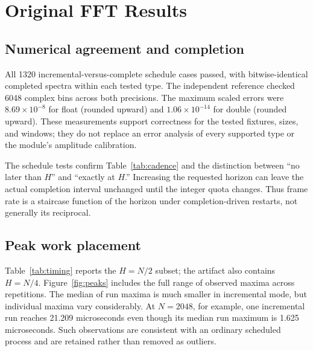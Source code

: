 \documentclass[11pt,letterpaper]{article}
\begin{document}
\section{Original FFT Results}
\label{sec:legacy-results}
\subsection{Numerical agreement and completion}
All 1320 incremental-versus-complete schedule cases passed, with bitwise-identical
completed spectra within each tested type. The independent reference checked
6048 complex bins across both precisions. The maximum scaled errors were
$8.69\times10^{-8}$ for float (rounded upward) and
$1.06\times10^{-14}$ for double (rounded upward). These measurements support
correctness for the tested fixtures, sizes, and windows; they do not replace an
error analysis of every supported type or the module's amplitude calibration.

The schedule tests confirm Table~\ref{tab:cadence} and the distinction between
``no later than $H$'' and ``exactly at $H$.'' Increasing the requested horizon
can leave the actual completion interval unchanged until the integer quota
changes. Thus frame rate is a staircase function of the horizon under
completion-driven restarts, not generally its reciprocal.

\subsection{Peak work placement}
Table~\ref{tab:timing} reports the $H=N/2$ subset; the artifact also contains
$H=N/4$. Figure~\ref{fig:peaks} includes the full range of observed maxima across
repetitions. The median of run maxima is much smaller in incremental mode,
but individual maxima vary considerably. At $N=2048$, for example, one
incremental run reaches 21.209 microseconds even though its median run maximum
is 1.625 microseconds. Such observations are consistent with an ordinary
scheduled process and are retained rather than removed as outliers.
\end{document}
